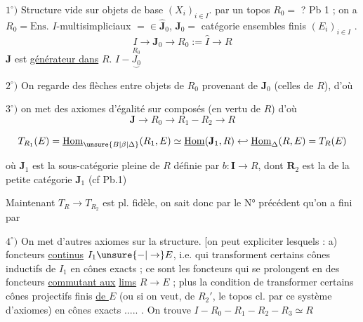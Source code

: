 
$1^\circ)$  Structure vide sur objets de base $(X_i)_{i\in I}$.  par un topos $R_0=$ ? Pb 1 ; on a $R_0=\mathrm{Ens.}$  $I$-multisimpliciaux  $={}\in\widehat{\mathbf J}_0$, $\mathbf J_0=$ catégorie  ensembles finis $(E_i)_{i\in I}$ .
\[
 I\to\mathbf J_0\to R_0\mathrel{:=}\widehat I\longrightarrow R
\]
$\mathbf J$ est \uline{générateur dans} $R$. \quad $I-\underset{\smile}{\overset{R_0}{J_0}}$

$2^\circ)$ On regarde des flèches  entre objets de $R_0$ provenant de $\mathbf J_0$ (celles de $R$), d'où   

$3^\circ)$ on met des axiomes d'égalité sur   composés (en vertu de $R$) d'où
\[
 \mathbf J\to R_0\to R_1-R_2\to R
\]

\[
 T_{R_1}(E)=\underline{\mathrm{Hom}}_{\unsure{B|\beta|\Delta}}(R_1,E)\simeq
 \underline{\mathrm{Hom}}(\mathbf J_1,R)\hookleftarrow
 \underline{\mathrm{Hom}}_{\Delta}(R,E)=T_R(E)
\]

où $\mathbf J_1$ est la sous-catégorie pleine de $R$ définie par $b:\mathbf I\to R$, dont $\mathbf R_{2}$ est la  de la petite catégorie $\mathbf J_1$ (cf Pb.1)

 Maintenant   $T_R\longrightarrow T_{R_2}$ est pl. fidèle, on sait donc par le N° précédent qu'on a fini par

$4^\circ)$ On met d'autres axiomes  sur la structure. [on peut expliciter lesquels : a) foncteurs \uline{continus} $I_1\unsure{-|\to}E$, i.e.  qui transforment certains  cônes inductifs de $I_1$  en cônes exacts  ;  ce sont les foncteurs qui se prolongent en des foncteurs \uline{commutant aux} \uline{lims} $R\to E$ ; plus la condition de transformer certains  cônes projectifs finis \uline{de $E$} (ou si on veut, de $R_2'$, le topos cl.  par ce système d'axiomes) en cônes exacts ..... . On trouve $I-R_0-R_1-R_2-R_3\simeq R$

